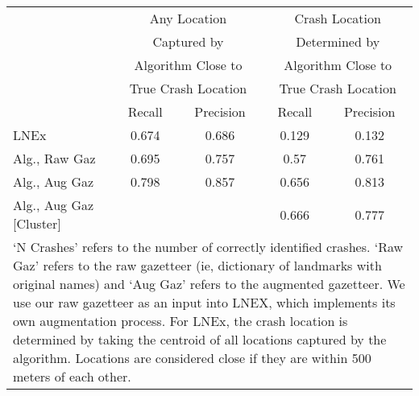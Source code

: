 \begin{tabular}{l cc | cc} \hline  & \multicolumn{2}{c|}{Any Location} & \multicolumn{2}{c}{Crash Location } \\  & \multicolumn{2}{c|}{Captured by} & \multicolumn{2}{c}{Determined by} \\  & \multicolumn{2}{c|}{Algorithm Close to} & \multicolumn{2}{c}{Algorithm Close to} \\  & \multicolumn{2}{c|}{True Crash Location} & \multicolumn{2}{c}{True Crash Location} \\  \hline  & Recall & Precision & Recall & Precision \\ \hline LNEx & 0.674  & 0.686  & 0.129  & 0.132  \\ Alg., Raw Gaz & 0.695  & 0.757  & 0.57  & 0.761  \\ Alg., Aug Gaz & 0.798  & 0.857  & 0.656  & 0.813  \\ Alg., Aug Gaz [Cluster] &  & & 0.666  & 0.777  \\ \hline \multicolumn{5}{p{11cm}}{`N Crashes' refers to the number of correctly 
    identified crashes. `Raw Gaz' refers to the raw gazetteer (ie, dictionary of 
    landmarks with original names) and `Aug Gaz' refers to the augmented gazetteer. 
    We use our raw gazetteer as an input into LNEX, which implements its own augmentation
    process. For LNEx, the crash location is determined by taking the centroid of all 
    locations captured by the algorithm. Locations are considered close if they are 
    within 500 meters of each other.} \end{tabular} 